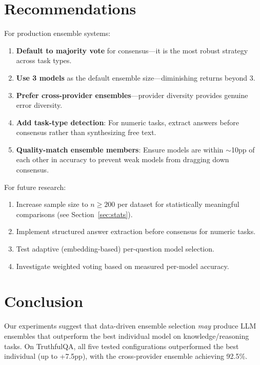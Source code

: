 \documentclass[11pt,a4paper]{article}
\begin{document}
\section{Recommendations}
\label{sec:recommendations}

For production ensemble systems:

\begin{enumerate}
    \item \textbf{Default to majority vote} for consensus---it is the most robust strategy across task types.
    \item \textbf{Use 3 models} as the default ensemble size---diminishing returns beyond 3.
    \item \textbf{Prefer cross-provider ensembles}---provider diversity provides genuine error diversity.
    \item \textbf{Add task-type detection}: For numeric tasks, extract answers before consensus rather than synthesizing free text.
    \item \textbf{Quality-match ensemble members}: Ensure models are within $\sim$10pp of each other in accuracy to prevent weak models from dragging down consensus.
\end{enumerate}

For future research:
\begin{enumerate}
    \item Increase sample size to $n \geq 200$ per dataset for statistically meaningful comparisons (see Section~\ref{sec:stats}).
    \item Implement structured answer extraction before consensus for numeric tasks.
    \item Test adaptive (embedding-based) per-question model selection.
    \item Investigate weighted voting based on measured per-model accuracy.
\end{enumerate}

\section{Conclusion}
\label{sec:conclusion}

Our experiments suggest that data-driven ensemble selection \emph{may} produce LLM ensembles that outperform the best individual model on knowledge/reasoning tasks.
On TruthfulQA, all five tested configurations outperformed the best individual (up to +7.5pp), with the cross-provider ensemble achieving 92.5\%.
\end{document}
